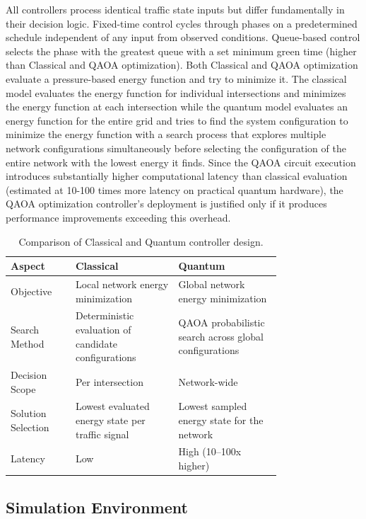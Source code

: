 \documentclass[12pt]{article}
\begin{document}
All controllers process identical traffic state inputs but differ fundamentally in their decision logic. Fixed-time control cycles through phases on a predetermined schedule independent of any input from observed conditions. Queue-based control selects the phase with the greatest queue with a set minimum green time (higher than Classical and QAOA optimization). Both Classical and QAOA optimization evaluate a pressure-based energy function and try to minimize it. The classical model evaluates the energy function for individual intersections and minimizes the energy function at each intersection while the quantum model evaluates an energy function for the entire grid and tries to find the system configuration to minimize the energy function with a search process that explores multiple network configurations simultaneously before selecting the configuration of the entire network with the lowest energy it finds. Since the QAOA circuit execution introduces substantially higher computational latency than classical evaluation (estimated at 10-100 times more latency on practical quantum hardware), the QAOA optimization controller's deployment is justified only if it produces performance improvements exceeding this overhead.

\begin{table}[H]
\centering
\begin{tabular}{@{} l p{0.38\linewidth} p{0.38\linewidth} @{}}
\toprule
\textbf{Aspect} & \textbf{Classical} & \textbf{Quantum} \\
\midrule
Objective & Local network energy minimization & Global network energy minimization \\
Search Method & Deterministic evaluation of candidate configurations & QAOA probabilistic search across global configurations \\
Decision Scope & Per intersection & Network-wide \\
Solution Selection & Lowest evaluated energy state per traffic signal & Lowest sampled energy state for the network \\
Latency & Low & High (10--100x higher) \\
\bottomrule
\end{tabular}
\caption{Comparison of Classical and Quantum controller design.}
\label{tab:classical-vs-quantum}
\end{table}

\subsection{Simulation Environment}
\end{document}
